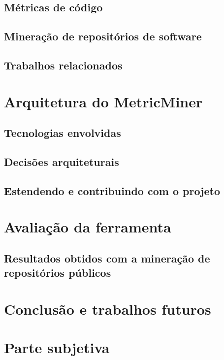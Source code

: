 \documentclass[a4paper, 12pt, twoside]{book}
\begin{document}
        
        
    
    \section{Métricas de código}
    
    \section{Mineração de repositórios de software}

    \section{Trabalhos relacionados} \label{ch:trabalhos}
    
\chapter{Arquitetura do MetricMiner} \label{ch:arquitetura}

    \section{Tecnologias envolvidas}
    
    \section{Decisões arquiteturais}
    
    \section{Estendendo e contribuindo com o projeto}
    
\chapter{Avaliação da ferramenta} \label{ch:avaliacao}

    \section{Resultados obtidos com a mineração de repositórios públicos}

\chapter{Conclusão e trabalhos futuros} \label{ch:conclusao}

\chapter{Parte subjetiva} \label{ch:subjetiva}



\end{document}

